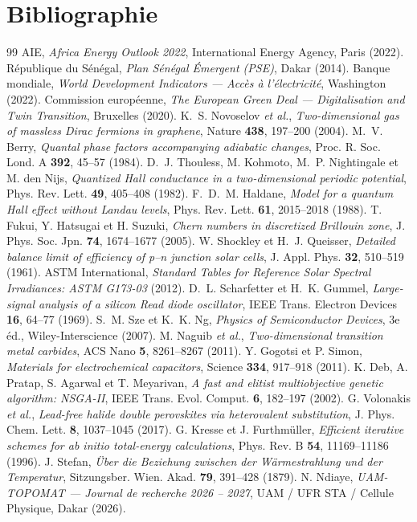 \documentclass[11pt,a4paper,french]{article}
\newcommand{\etal}{\emph{et al.}}
\begin{document}
\section*{Bibliographie}
\begin{thebibliography}{99}
 AIE, \emph{Africa Energy Outlook 2022}, International Energy Agency, Paris (2022).
 République du Sénégal, \emph{Plan Sénégal Émergent (PSE)}, Dakar (2014).
 Banque mondiale, \emph{World Development Indicators — Accès à l'électricité}, Washington (2022).
 Commission européenne, \emph{The European Green Deal — Digitalisation and Twin Transition}, Bruxelles (2020).
 K.~S. Novoselov \etal, \emph{Two-dimensional gas of massless Dirac fermions in graphene}, Nature \textbf{438}, 197--200 (2004).
 M.~V. Berry, \emph{Quantal phase factors accompanying adiabatic changes}, Proc. R. Soc. Lond. A \textbf{392}, 45--57 (1984).
 D.~J. Thouless, M. Kohmoto, M.~P. Nightingale et M. den Nijs, \emph{Quantized Hall conductance in a two-dimensional periodic potential}, Phys. Rev. Lett. \textbf{49}, 405--408 (1982).
 F.~D.~M. Haldane, \emph{Model for a quantum Hall effect without Landau levels}, Phys. Rev. Lett. \textbf{61}, 2015--2018 (1988).
 T. Fukui, Y. Hatsugai et H. Suzuki, \emph{Chern numbers in discretized Brillouin zone}, J. Phys. Soc. Jpn. \textbf{74}, 1674--1677 (2005).
 W. Shockley et H.~J. Queisser, \emph{Detailed balance limit of efficiency of p--n junction solar cells}, J. Appl. Phys. \textbf{32}, 510--519 (1961).
 ASTM International, \emph{Standard Tables for Reference Solar Spectral Irradiances: ASTM G173-03} (2012).
 D.~L. Scharfetter et H.~K. Gummel, \emph{Large-signal analysis of a silicon Read diode oscillator}, IEEE Trans. Electron Devices \textbf{16}, 64--77 (1969).
 S.~M. Sze et K.~K. Ng, \emph{Physics of Semiconductor Devices}, 3e éd., Wiley-Interscience (2007).
 M. Naguib \etal, \emph{Two-dimensional transition metal carbides}, ACS Nano \textbf{5}, 8261--8267 (2011).
 Y. Gogotsi et P. Simon, \emph{Materials for electrochemical capacitors}, Science \textbf{334}, 917--918 (2011).
 K. Deb, A. Pratap, S. Agarwal et T. Meyarivan, \emph{A fast and elitist multiobjective genetic algorithm: NSGA-II}, IEEE Trans. Evol. Comput. \textbf{6}, 182--197 (2002).
 G. Volonakis \etal, \emph{Lead-free halide double perovskites via heterovalent substitution}, J. Phys. Chem. Lett. \textbf{8}, 1037--1045 (2017).
 G. Kresse et J. Furthmüller, \emph{Efficient iterative schemes for ab initio total-energy calculations}, Phys. Rev. B \textbf{54}, 11169--11186 (1996).
 J. Stefan, \emph{Über die Beziehung zwischen der Wärmestrahlung und der Temperatur}, Sitzungsber. Wien. Akad. \textbf{79}, 391--428 (1879).
 N. Ndiaye, \emph{UAM-TOPOMAT — Journal de recherche 2026 – 2027}, UAM / UFR STA / Cellule Physique, Dakar (2026).
\end{thebibliography}
\end{document}
